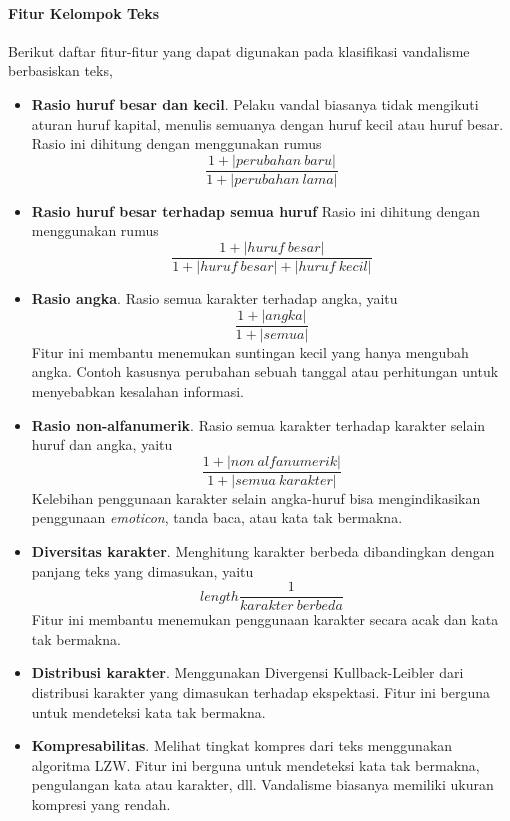 \paragraph{Fitur Kelompok Teks}

Berikut daftar fitur-fitur yang dapat digunakan pada klasifikasi vandalisme berbasiskan teks,

\begin{itemize}

\item \textbf{Rasio huruf besar dan kecil}.
Pelaku vandal biasanya tidak mengikuti aturan huruf kapital, menulis semuanya dengan huruf kecil atau huruf besar.
Rasio ini dihitung dengan menggunakan rumus
\[
\frac{1 + |perubahan\ baru|}{1 + |perubahan\ lama|}
\]

\item \textbf{Rasio huruf besar terhadap semua huruf}
Rasio ini dihitung dengan menggunakan rumus
\[
\frac{1 + |huruf\ besar|}{1 + |huruf\ besar| + |huruf\ kecil|}
\]

\item \textbf{Rasio angka}.
Rasio semua karakter terhadap angka, yaitu
\[
\frac{1 + |angka|}{1 + |semua|}
\]
Fitur ini membantu menemukan suntingan kecil yang hanya mengubah angka.
Contoh kasusnya perubahan sebuah tanggal atau perhitungan untuk menyebabkan kesalahan informasi.

\item \textbf{Rasio non-alfanumerik}.
Rasio semua karakter terhadap karakter selain huruf dan angka, yaitu
\[
\frac{1 + |non\ alfanumerik|}{1 + |semua\ karakter|}
\]
Kelebihan penggunaan karakter selain angka-huruf bisa mengindikasikan penggunaan \textit{emoticon}, tanda baca, atau kata tak bermakna.

\item \textbf{Diversitas karakter}.
Menghitung karakter berbeda dibandingkan dengan panjang teks yang dimasukan, yaitu
\[
length \frac{1}{karakter\ berbeda}
\]
Fitur ini membantu menemukan penggunaan karakter secara acak dan kata tak bermakna.

\item \textbf{Distribusi karakter}.
Menggunakan Divergensi Kullback-Leibler dari distribusi karakter yang dimasukan terhadap ekspektasi.
Fitur ini berguna untuk mendeteksi kata tak bermakna.

\item \textbf{Kompresabilitas}.
Melihat tingkat kompres dari teks menggunakan algoritma LZW.
Fitur ini berguna untuk mendeteksi kata tak bermakna, pengulangan kata atau karakter, dll.
Vandalisme biasanya memiliki ukuran kompresi yang rendah.


\end{itemize}

